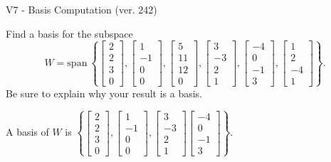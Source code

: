 \begin{exercise}
  \begin{exerciseTitle}V7 - Basis Computation (ver. 242)\end{exerciseTitle}
  \begin{exerciseStatement}
    Find a basis for the subspace 
\[W=\mathrm{span}\ \left\{\left[\begin{array}{r}
2 \\
2 \\
3 \\
0
\end{array}\right] , \left[\begin{array}{r}
1 \\
-1 \\
0 \\
0
\end{array}\right] , \left[\begin{array}{r}
5 \\
11 \\
12 \\
0
\end{array}\right] , \left[\begin{array}{r}
3 \\
-3 \\
2 \\
1
\end{array}\right] , \left[\begin{array}{r}
-4 \\
0 \\
-1 \\
3
\end{array}\right] , \left[\begin{array}{r}
1 \\
2 \\
-4 \\
1
\end{array}\right]\right\}.\]
 Be sure to explain why your result is a basis.


  \end{exerciseStatement}
  \begin{exerciseAnswer}
   A basis of \(W\) is  \(\left\{\left[\begin{array}{r}
2 \\
2 \\
3 \\
0
\end{array}\right] , \left[\begin{array}{r}
1 \\
-1 \\
0 \\
0
\end{array}\right] , \left[\begin{array}{r}
3 \\
-3 \\
2 \\
1
\end{array}\right] \left[\begin{array}{r}
-4 \\
0 \\
-1 \\
3
\end{array}\right]\right\}\).
  


  \end{exerciseAnswer}
\end{exercise}